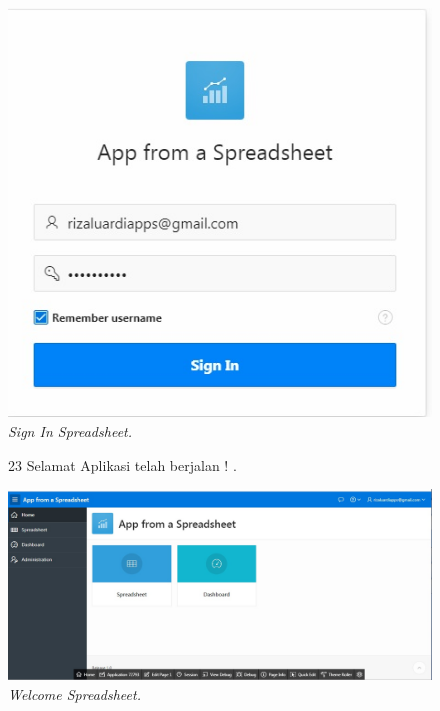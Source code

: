 \begin{enumerate}
\begin{figure}
    \begin{center}
\includegraphics[scale=0.4]{figures/create5.jpg}
    \caption{\textit{Sign In Spreadsheet.}}
        \end{center}
\label{gambar}
\end{figure}

\begin{figure}
\item[23]Selamat Aplikasi telah berjalan ! .

    \begin{center}
\includegraphics[scale=0.4]{figures/congratz.jpg}
    \caption{\textit{Welcome Spreadsheet.}}
        \end{center}
\label{gambar}
\end{figure}

\end{enumerate}
